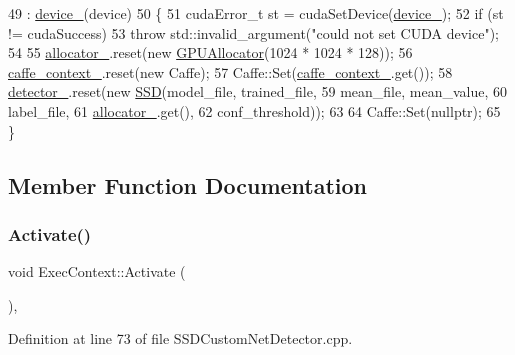 \begin{DoxyCode}
49         : \mbox{\hyperlink{class_exec_context_a05d01fbf5236f59519a9708580c175da}{device\_}}(device)
50     \{
51         cudaError\_t st = cudaSetDevice(\mbox{\hyperlink{class_exec_context_a05d01fbf5236f59519a9708580c175da}{device\_}});
52         \textcolor{keywordflow}{if} (st != cudaSuccess)
53             \textcolor{keywordflow}{throw} std::invalid\_argument(\textcolor{stringliteral}{"could not set CUDA device"});
54 
55         \mbox{\hyperlink{class_exec_context_aa91ffaae541ca563b5aabb2f2a1c53b5}{allocator\_}}.reset(\textcolor{keyword}{new} \mbox{\hyperlink{class_g_p_u_allocator}{GPUAllocator}}(1024 * 1024 * 128));
56         \mbox{\hyperlink{class_exec_context_a6561f67a969e8b38001d488e4937515f}{caffe\_context\_}}.reset(\textcolor{keyword}{new} Caffe);
57         Caffe::Set(\mbox{\hyperlink{class_exec_context_a6561f67a969e8b38001d488e4937515f}{caffe\_context\_}}.get());
58         \mbox{\hyperlink{class_exec_context_acfecd6b6e282a7b7c67451dedd8bacae}{detector\_}}.reset(\textcolor{keyword}{new} \mbox{\hyperlink{class_s_s_d}{SSD}}(model\_file, trained\_file,
59             mean\_file, mean\_value,
60             label\_file,
61             \mbox{\hyperlink{class_exec_context_aa91ffaae541ca563b5aabb2f2a1c53b5}{allocator\_}}.get(),
62             conf\_threshold));
63 
64         Caffe::Set(\textcolor{keyword}{nullptr});
65     \}
\end{DoxyCode}


\subsection{Member Function Documentation}
\mbox{\label{class_exec_context_aad6945417b4a10d9ed0d338d16a1f105}} 
\subsubsection{\texorpdfstring{Activate()}{Activate()}}
{\footnotesize\ttfamily void Exec\+Context\+::\+Activate (\begin{DoxyParamCaption}{ }\end{DoxyParamCaption})\hspace{0.3cm}{\ttfamily [inline]}, {\ttfamily [private]}}



Definition at line 73 of file S\+S\+D\+Custom\+Net\+Detector.\+cpp.


